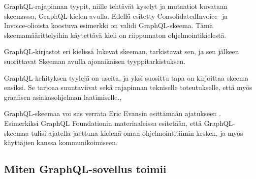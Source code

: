 GraphQL-rajapinnan tyypit, niille tehtävät kyselyt ja mutaatiot kuvataan
skeemassa, GraphQL-kielen avulla. Edellä esitetty ConsolidatedInvoice-
ja Invoice-olioista koostuva esimerkki on validi GraphQL-skeema. Tämä
skeemamäärittelyihin käytettävä kieli on riippumaton
ohjelmointikielestä.

GraphQL-kirjastot eri kielissä lukevat skeeman, tarkistavat sen, ja sen
jälkeen suorittavat Skeeman avulla ajonaikaisen tyyppitarkistuksen.

GraphQL-kehityksen tyylejä on useita, ja yksi suosittu tapa on
kirjoittaa skeema ensiksi. Se tarjoaa suuntaviivat sekä rajapinnan
tekniselle toteutukselle, että myös graafisen asiakasohjelman
laatimiselle.\cite{SchemaDriven2017Nov},\cite{SchemaDrivenDesign2021Jul}

GraphQL-skeemaa voi siis verrata Eric Evansin esittämään ajatukseen
. Esimerkiksi GraphQL
Foundationin materiaaleissa esitetään, että GraphQL-skeemaa tulisi
ajatella jaettuna kielenä oman ohjelmointitiimin kesken, ja myös
käyttäjien kanssa kommunikoimiseen.\cite{thinkingInGraphs}

\hypertarget{miten-graphql-sovellus-toimii}{%
\subsection{Miten GraphQL-sovellus
toimii}\label{miten-graphql-sovellus-toimii}}

